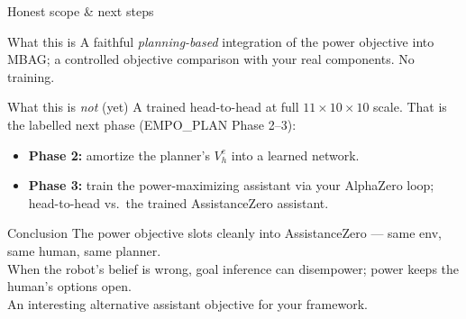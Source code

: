 \documentclass[aspectratio=169,10pt]{beamer}
\newcommand{\Power}[1]{\textcolor{cPower}{#1}}
\newcommand{\Goal}[1]{\textcolor{cGoal}{#1}}
\newcommand{\Veh}{V^{e}_{h}}
\begin{document}
\begin{frame}{Honest scope \& next steps}
  \begin{block}{What this is}
    A faithful \emph{planning-based} integration of the power objective into MBAG;
    a controlled objective comparison with your real components. No training.
  \end{block}
  \begin{block}{What this is \emph{not} (yet)}
    A trained head-to-head at full $11\times10\times10$ scale. That is the
    labelled next phase (EMPO\_PLAN Phase 2--3):
    \begin{itemize}\footnotesize
      \item \textbf{Phase 2:} amortize the planner's $\Veh$ into a learned network.
      \item \textbf{Phase 3:} train the power-maximizing assistant via your
        AlphaZero loop; head-to-head vs.\ the trained AssistanceZero assistant.
    \end{itemize}
  \end{block}
\end{frame}

\begin{frame}[standout]{Conclusion}
  The power objective slots cleanly into AssistanceZero --- same env, same human,
  same planner.\\[1ex]
  When the robot's belief is wrong, \Goal{goal inference} can disempower; \Power{power}
  keeps the human's options open.\\[1ex]
  \footnotesize An interesting alternative assistant objective for your framework.
\end{frame}
\end{document}
